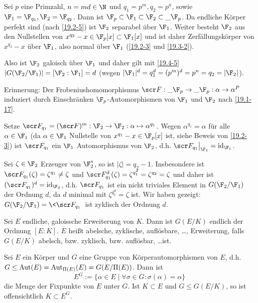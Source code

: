 \begin{ex} \label{19.4-6}
	Sei $p$ eine Primzahl, $n = md \in \N$ und $q_1 = p^m, q_2 = p^n$, sowie $\F_1 = \F_{q_1}, \F_2 = \F_{q_2}$.
	Dann ist $\F_p \subset \F_1 \subset \F_2 \subset \_{\F_p}$.
	Da endliche Körper perfekt sind (nach \ref{19.2-5}) ist $\F_2$ separabel über $\F_1$.
	Weiter besteht $\F_2$ aus den Nullstellen von $x^{q_2} - x \in \F_p[x] \subset \F_1[x]$ und ist daher Zerfällungskörper von $x^{q_2} - x$ über $\F_1$, also normal über $\F_1$ (\ref{19.2-3} und \ref{19.3-2}).

	Also ist $\F_2$ galoisch über $\F_1$ und daher gilt mit \ref{19.4-5} $|G(\F_2 / \F_1)| = [\F_2 : \F_1] = d$ (wegen $|\F_1|^d = q_1^d = (p^m)^d = p^n = q_2 = |\F_2|$).

	Erinnerung:
	Der Frobeniushomomorphismus $\scr F: \_{\F_p} \to \_{\F_p}: \alpha \to \alpha^P$ induziert durch Einschränken $\F_p$-Automorphismen von $\F_1$ und $\F_2$ nach \ref{19.1-17}.

	Setze $\scr F_{q_1} = (\scr F)^m: \F_2 \to \F_2: \alpha \mapsto \alpha^{q_1}$.
	Wegen $\alpha^{q_1} = \alpha$ für alle $\alpha \in \F_1$ (da $\alpha \in \F_1$ Nullstelle von $x^{q_1} - x \in \F_p[x]$ ist, siehe Beweis von \ref{19.2-3}) ist $\scr F_{q_1}$ ein $\F_1$ Automorphismus von $\F_2$, d.h. $\scr F_{q_1}\big|_{\F_1} = \id_{\F_1}$.

	Sei $\zeta \in \F_2$ Erzeuger von $\F_2^*$, so ist $|\zeta| = q_2 - 1$.
	Insbesondere ist $\scr F_{q_1}(\zeta) = \zeta^{q_1} \neq \zeta$ und $\scr F_{q_1}^d(\zeta) = \zeta^{q_1^{d}} = \zeta^{q_2} = \zeta$ und daher ist $(\scr F_{q_1})^d = \id_{\F_2}$, d.h. $\scr F_{q_1}$ ist ein nicht triviales Element in $G(\F_2 / \F_1)$ der Ordnung $d$, da $d$ minimal mit $\zeta^{q_1^{d}} = \zeta$ ist.
	Wir haben gezeigt: $G(\F_2 / \F_1) = \< \scr F_{q_1} \>$ ist zyklisch der Ordnung $d$.
\end{ex}

\begin{conv} \label{19.4-7}
	Sei $E$ endliche, galoissche Erweiterung von $K$.
	Dann ist $G(E / K)$ endlich der Ordnung $[E: K]$.
	$E$ heißt abelsche, zyklische, auflösbare, \dots, Erweiterung, falls $G(E / K)$ abelsch, bzw. zyklisch, bzw. auflösbar, \dots ist.
\end{conv}

\begin{df} \label{19.4-8}
	Sei $E$ ein Körper und $G$ eine Gruppe von Körperautomorphismen von $E$, d.h. $G \le \operatorname{Aut}(E) = \operatorname{Aut}_{\Pi(E)}(E) = G(E / \Pi(E))$.
	Dann ist
	\[
		E^G := \{\alpha \in E \;|\; \forall \sigma \in G : \sigma(\alpha) = \alpha\}
	\]
	die Menge der Fixpunkte von $E$ unter $G$.
	Ist $K \subset E$ und $G \le G(E / K)$, so ist offensichtlich $K \subset E^G$.
\end{df}

